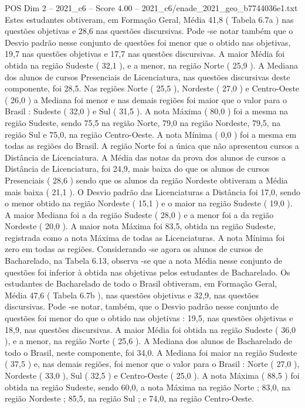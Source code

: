 \begin{textsample}{POS Dim 2 – 2021\_c6 – Score 4.00 – 2021\_c6/enade\_2021\_geo\_b7744036e1.txt}
Estes estudantes obtiveram, em Formação Geral, Média 41,8 ( Tabela 6.7a ) nas questões objetivas e 28,6 nas questões discursivas.
Pode -se notar também que o Desvio padrão nesse conjunto de questões foi menor que o obtido nas objetivas, 19,7 nas questões objetivas e 17,7 nas questões discursivas.
A maior Média foi obtida na região Sudeste ( 32,1 ), e a menor, na região Norte ( 25,9 ).
A Mediana dos alunos de cursos Presenciais de Licenciatura, nas questões discursivas deste componente, foi 28,5.
Nas regiões Norte ( 25,5 ), Nordeste ( 27,0 ) e Centro-Oeste ( 26,0 ) a Mediana foi menor e nas demais regiões foi maior que o valor para o Brasil : Sudeste ( 32,0 ) e Sul ( 31,5 ).
A nota Máxima ( 80,0 ) foi a mesma na região Sudeste, sendo 75,5 na região Norte, 79,0 na região Nordeste, 79,5, na região Sul e 75,0, na região Centro-Oeste.
A nota Mínima ( 0,0 ) foi a mesma em todas as regiões do Brasil.
A região Norte foi a única que não apresentou cursos a Distância de Licenciatura.
A Média das notas da prova dos alunos de cursos a Distância de Licenciatura, foi 24,9, mais baixa do que os alunos de cursos Presenciais ( 28,6 ) sendo que os alunos da região Nordeste obtiveram a Média mais baixa ( 21,1 ).
O Desvio padrão das Licenciaturas a Distância foi 17,0, sendo o menor obtido na região Nordeste ( 15,1 ) e o maior na região Sudeste ( 19,0 ).
A maior Mediana foi a da região Sudeste ( 28,0 ) e a menor foi a da região Nordeste ( 20,0 ).
A maior nota Máxima foi 83,5, obtida na região Sudeste, registrada como a nota Máxima de todas as Licenciaturas.
A nota Mínima foi zero em todas as regiões.
Considerando -se agora os alunos de cursos de Bacharelado, na Tabela 6.13, observa -se que a nota Média nesse conjunto de questões foi inferior à obtida nas objetivas pelos estudantes de Bacharelado.
Os estudantes de Bacharelado de todo o Brasil obtiveram, em Formação Geral, Média 47,6 ( Tabela 6.7b ), nas questões objetivas e 32,9, nas questões discursivas.
Pode -se notar, também, que o Desvio padrão nesse conjunto de questões foi menor do que o obtido nas objetivas : 19,5, nas questões objetivas e 18,9, nas questões discursivas.
A maior Média foi obtida na região Sudeste ( 36,0 ), e a menor, na região Norte ( 25,6 ).
A Mediana dos alunos de Bacharelado de todo o Brasil, neste componente, foi 34,0.
A Mediana foi maior na região Sudeste ( 37,5 ) e, nas demais regiões, foi menor que o valor para o Brasil : Norte ( 27,0 ), Nordeste ( 33,0 ), Sul ( 32,5 ) e Centro-Oeste ( 25,0 ).
A nota Máxima ( 88,5 ) foi obtida na região Sudeste, sendo 60,0, a nota Máxima na região Norte ; 83,0, na região Nordeste ; 85,5, na região Sul ; e 74,0, na região Centro-Oeste.

\end{textsample}
